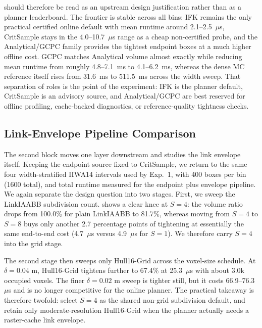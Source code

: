 \documentclass[journal]{IEEEtran}
\begin{document}
 should therefore be read as an upstream design
justification rather than as a planner leaderboard. The frontier is stable
across all bins: IFK remains the only practical certified online default with
mean runtime around 2.1--2.5~$\mu$s, CritSample stays in the 4.0--10.7~$\mu$s
range as a cheap non-certified probe, and the Analytical/GCPC family provides
the tightest endpoint boxes at a much higher offline cost. GCPC matches
Analytical volume almost exactly while reducing mean runtime from roughly
4.8--7.1~ms to 4.1--6.2~ms, whereas the dense MC reference itself rises from
31.6~ms to 511.5~ms across the width sweep. That separation of roles is the point
of the experiment: IFK is the planner default, CritSample is an advisory
source, and Analytical/GCPC are best reserved for offline profiling,
cache-backed diagnostics, or reference-quality tightness checks.



\subsection{Link-Envelope Pipeline Comparison}\label{sec:exp_linkenv}

The second block moves one layer downstream and studies the link envelope
itself. Keeping the endpoint source fixed to CritSample, we return to the
same four width-stratified IIWA14 intervals used by Exp.~1, with 400 boxes
per bin (1600 total), and total runtime measured for the endpoint plus
envelope pipeline. We again separate the design question into two stages.
First, we sweep the LinkIAABB subdivision count.
 shows a clear knee at $S=4$: the volume
ratio drops from 100.0\% for plain LinkIAABB to 81.7\%, whereas moving from
$S=4$ to $S=8$ buys only another 2.7 percentage points of tightening at
essentially the same end-to-end cost (4.7~$\mu$s versus 4.9~$\mu$s for
$S=1$). We therefore carry $S=4$ into the grid stage.

The second stage then sweeps only Hull16-Grid across the voxel-size schedule.
At $\delta=0.04$ m, Hull16-Grid tightens further to 67.4\% at 25.3~$\mu$s with
about 3.0k occupied voxels. The finer $\delta=0.02$ m sweep is tighter still,
but it costs 66.9--76.3~$\mu$s and is no longer competitive for the online
planner. The practical takeaway is therefore twofold: select $S=4$ as the
shared non-grid subdivision default, and retain only moderate-resolution
Hull16-Grid when the planner actually needs a raster-cache link envelope.
\end{document}
